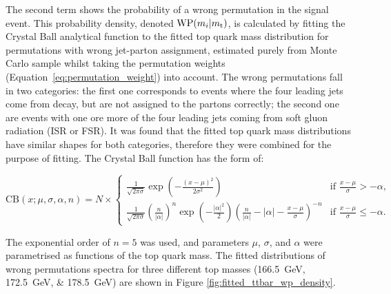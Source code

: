 The second term shows the probability of a wrong permutation in the signal event. This probability density, denoted
$\textrm{WP}(m_i|m_\mathrm{t})$, is calculated by fitting the Crystal Ball analytical function to the fitted top quark mass
distribution for permutations with wrong jet-parton assignment, estimated purely from Monte Carlo \ttbar sample whilst
taking the permutation weights (Equation~\ref{eq:permutation_weight}) into account. The wrong permutations fall in two
categories: the first one corresponds to events where the four leading jets come from \ttbar decay, but are not assigned
to the partons correctly; the second one are events with one ore more of the four leading jets coming from soft gluon
radiation (ISR or FSR). It was found that the fitted top quark mass distributions have similar shapes for both
categories, therefore they were combined for the purpose of fitting. The Crystal Ball function has the form of:

\begin{equation}
\textrm{CB}(x;\mu,\sigma,\alpha,n) = N \times
\begin{cases}
\frac{1}{\sqrt{2\pi\sigma}}\exp(-\frac{(x-\mu)^2}{2\sigma^2}) & \text{if $\frac{x-\mu}{\sigma} > -\alpha$,} \\
\frac{1}{\sqrt{2\pi\sigma}}(\frac{n}{|\alpha|})^n
\exp(-\frac{|\alpha|^2}{2})(\frac{n}{|\alpha|}-|\alpha|-\frac{x-\mu}{\sigma})^{-n} & \text{if $\frac{x-\mu}{\sigma}
\leq -\alpha$.}
\end{cases}
\label{eq:crystal_ball}
\end{equation}

The exponential order of $n=\num{5}$ was used, and parameters $\mu$, $\sigma$, and $\alpha$ were parametrised as
functions of the top quark mass. The fitted distributions of wrong permutations spectra for three different top masses
(\SIlist{166.5;172.5;178.5}{\GeV}) are shown in Figure \ref{fig:fitted_ttbar_wp_density}.

